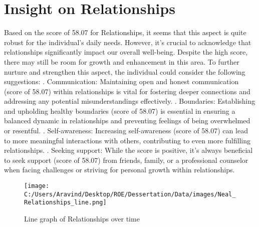 \documentclass[10pt, a4paper]{article}%
\begin{document}
\section{Insight on Relationships}%
\label{sec:InsightonRelationships}%
Based on the score of 58.07 for Relationships, it seems that this aspect is quite robust for the individual's daily needs. However, it's crucial to acknowledge that relationships significantly impact our overall well{-}being. Despite the high score, there may still be room for growth and enhancement in this area.\newline%
\newline%
To further nurture and strengthen this aspect, the individual could consider the following suggestions:\newline%
. Communication: Maintaining open and honest communication (score of 58.07) within relationships is vital for fostering deeper connections and addressing any potential misunderstandings effectively.\newline%
. Boundaries: Establishing and upholding healthy boundaries (score of 58.07) is essential in ensuring a balanced dynamic in relationships and preventing feelings of being overwhelmed or resentful.\newline%
. Self{-}awareness: Increasing self{-}awareness (score of 58.07) can lead to more meaningful interactions with others, contributing to even more fulfilling relationships.\newline%
. Seeking support: While the score is positive, it's always beneficial to seek support (score of 58.07) from friends, family, or a professional counselor when facing challenges or striving for personal growth within relationships.%


\begin{figure}[H]%
\centering%
\texttt{[image: C:/Users/Aravind/Desktop/ROE/Dessertation/Data/images/Neal\_Relationships\_line.png]}%
\caption{Line graph of Relationships over time}%
\end{figure}

%
\end{document}
